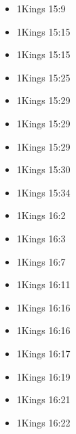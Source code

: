 \documentclass[14pt]{book}
\begin{document}
\begin{multicols}{2}
\begin{itemize}
											\item 1Kings 15:9
											
											\item 1Kings 15:15
											
											\item 1Kings 15:15
											
											\item 1Kings 15:25
											
											\item 1Kings 15:29
											
											\item 1Kings 15:29
											
											\item 1Kings 15:29
											
											\item 1Kings 15:30
											
											\item 1Kings 15:34
											
											\item 1Kings 16:2
											
											\item 1Kings 16:3
											
											\item 1Kings 16:7
											
											\item 1Kings 16:11
											
											\item 1Kings 16:16
											
											\item 1Kings 16:16
											
											\item 1Kings 16:17
											
											\item 1Kings 16:19
											
											\item 1Kings 16:21
											
											\item 1Kings 16:22
											

\end{itemize}
\end{multicols}
\end{document}
